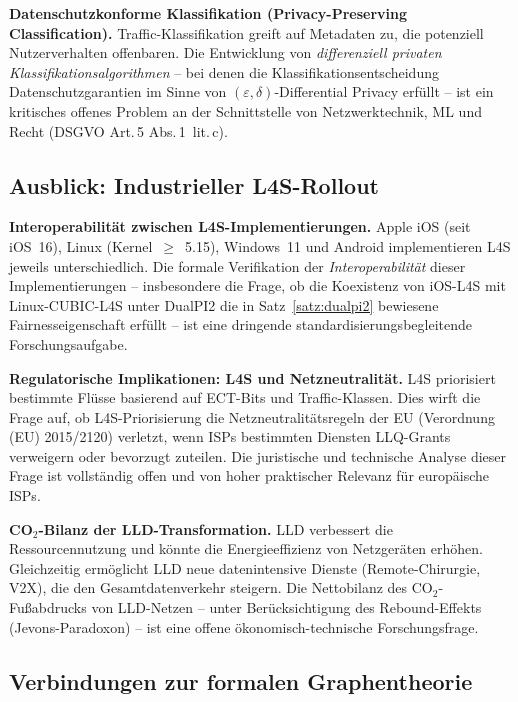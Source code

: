 ﻿\documentclass[a4paper,12pt]{article}
\theoremstyle{definition}
\begin{document}
\textbf{Datenschutzkonforme Klassifikation (Privacy-Preserving Classification).}
Traffic-Klassifikation greift auf Metadaten zu, die potenziell Nutzerverhalten
offenbaren. Die Entwicklung von \emph{differenziell privaten
Klassifikationsalgorithmen} -- bei denen die Klassifikationsentscheidung
Datenschutzgarantien im Sinne von $(\varepsilon, \delta)$-Differential Privacy
erf\"{u}llt -- ist ein kritisches offenes Problem an der Schnittstelle von
Netzwerktechnik, ML und Recht (DSGVO Art.\,5 Abs.\,1~lit.\,c).

\subsection{Ausblick: Industrieller L4S-Rollout}

\textbf{Interoperabilit\"{a}t zwischen L4S-Implementierungen.}
Apple iOS (seit iOS~16), Linux (Kernel~$\geq$~5.15), Windows~11 und Android
implementieren L4S jeweils unterschiedlich. Die formale Verifikation der
\emph{Interoperabilit\"{a}t} dieser Implementierungen -- insbesondere die
Frage, ob die Koexistenz von iOS-L4S mit Linux-CUBIC-L4S unter DualPI2
die in Satz~\ref{satz:dualpi2} bewiesene Fairnesseigenschaft erf\"{u}llt -- ist
eine dringende standardisierungsbegleitende Forschungsaufgabe.

\textbf{Regulatorische Implikationen: L4S und Netzneutralit\"{a}t.}
L4S priorisiert bestimmte Fl\"{u}sse basierend auf ECT-Bits und Traffic-Klassen.
Dies wirft die Frage auf, ob L4S-Priorisierung die Netzneutralit\"{a}tsregeln
der EU (Verordnung (EU) 2015/2120) verletzt, wenn ISPs bestimmten Diensten
LLQ-Grants verweigern oder bevorzugt zuteilen. Die juristische und technische
Analyse dieser Frage ist vollst\"{a}ndig offen und von hoher praktischer Relevanz
f\"{u}r europ\"{a}ische ISPs.

\textbf{CO$_2$-Bilanz der LLD-Transformation.}
LLD verbessert die Ressourcennutzung und k\"{o}nnte die Energieeffizienz von
Netzger\"{a}ten erh\"{o}hen. Gleichzeitig erm\"{o}glicht LLD neue daten\-intensive
Dienste (Remote-Chirurgie, V2X), die den Gesamtdatenverkehr steigern. Die
Nettobilanz des CO$_2$-Fußabdrucks von LLD-Netzen -- unter Ber\"{u}cksichtigung
des Rebound-Effekts (Jevons-Paradoxon) -- ist eine offene \"{o}konomisch-technische
Forschungsfrage.

\subsection{Verbindungen zur formalen Graphentheorie}
\end{document}
